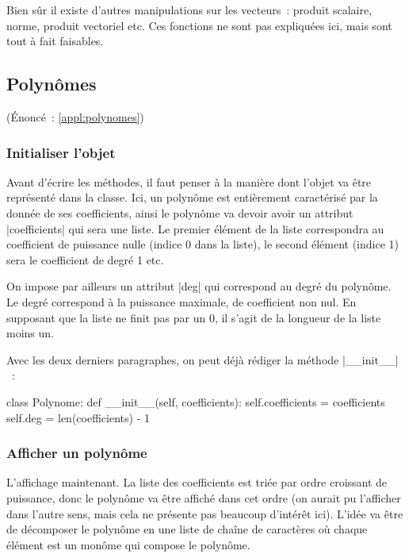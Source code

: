 		Bien sûr il existe d'autres manipulations sur les vecteurs~: produit scalaire, norme, produit vectoriel etc. Ces fonctions ne sont pas expliquées ici, mais sont tout à fait faisables.
	
	\subsection{Polynômes} \label{corr:polynomes} (Énoncé~: \ref{appl:polynomes})
		
		\subsubsection{Initialiser l'objet}
		Avant d'écrire les méthodes, il faut penser à la manière dont l'objet va être représenté dans la classe. Ici, un polynôme est entièrement caractérisé par la donnée de ses coefficients, ainsi le polynôme va devoir avoir un attribut \python|coefficients| qui sera une liste. Le premier élément de la liste correspondra au coefficient de puissance nulle (indice 0 dans la liste), le second élément (indice 1) sera le coefficient de degré 1 etc.
		
		On impose par ailleurs un attribut \python|deg| qui correspond au degré du polynôme. Le degré correspond à la puissance maximale, de coefficient non nul. En supposant que la liste ne finit pas par un $0$, il s'agit de la longueur de la liste moins un.
		
		Avec les deux derniers paragraphes, on peut déjà rédiger la méthode \python|__init__|~:
		\begin{pythoncode}
			class Polynome:
				def __init__(self, coefficients):
					self.coefficients = coefficients
					self.deg = len(coefficients) - 1
		\end{pythoncode}
		
		\subsubsection{Afficher un polynôme}
		L'affichage maintenant. La liste des coefficients est triée par ordre croissant de puissance, donc le polynôme va être affiché dans cet ordre (on aurait pu l'afficher dans l'autre sens, mais cela ne présente pas beaucoup d'intérêt ici). L'idée va être de décomposer le polynôme en une liste de chaîne de caractères où chaque élément est un monôme qui compose le polynôme.
		
